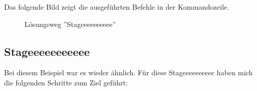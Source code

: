 \documentclass[12pt, a4paper, titlepage, oneside]{scrartcl}
\begin{document}
	Das folgende Bild zeigt die ausgeführten Befehle in der Kommandozeile.

	\begin{figure}[h!]
		\centering
		\caption{Lösungsweg ''Stageeeeeeeeee''}
		\label{fig:stageeeeeeeeee_solution}
	\end{figure}

	\newpage

	\subsection{Stageeeeeeeeeee}
	Bei diesem Beispiel war es wieder ähnlich. Für diese Stageeeeeeeeee haben mich
	die folgenden Schritte zum Ziel geführt:
\end{document}
